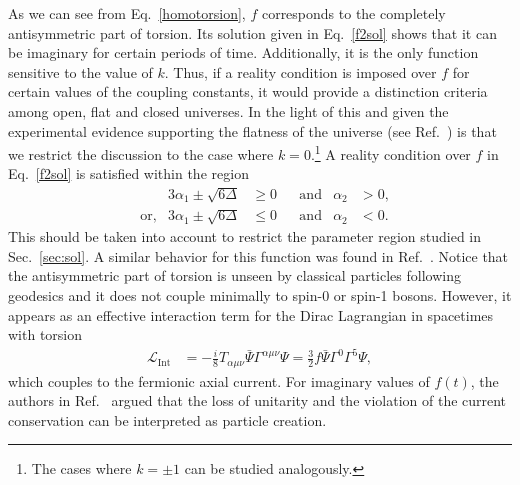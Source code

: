 \documentclass[aps,prd,12pt,superscriptaddress,showpacs,showkeys,longbibliography,reprint,nofootinbib]{revtex4-1}
\begin{document}



As we can see from Eq.~\eqref{homotorsion}, $f$ corresponds to the completely antisymmetric part of torsion. Its solution given in Eq.~\eqref{f2sol} shows that it can be imaginary for certain periods of time. Additionally, it is the only function sensitive to the value of $k$. Thus, if a reality condition is imposed over $f$ for certain values of the coupling constants, it would provide a distinction criteria among open, flat and closed universes. In the light of this and given the experimental evidence supporting the flatness of the universe (see Ref.~\cite{Spergel:2006hy}) is that we restrict the discussion to the case where $k=0$.\footnote{The cases where $k = \pm1$ can be studied analogously.} A reality condition over $f$ in Eq.~\eqref{f2sol} is satisfied within the region 
\begin{align*}
 & & 3\alpha_1 \pm \sqrt{6\Delta} &\geq 0 & &\mbox{and}& \alpha_2 &>0, \\
 & \mbox{or,} & 3\alpha_1 \pm \sqrt{6\Delta} &\leq 0 & &\mbox{and}& \alpha_2&<0.
\end{align*}
This should be taken into account to restrict the parameter region studied in Sec.~\ref{sec:sol}.  
A similar behavior for this function was found in Ref.~\cite{Toloza:2013wi}. Notice that the antisymmetric part of torsion is unseen by classical particles following geodesics and it does not couple minimally to spin-0 or spin-1 bosons. However, it appears as an effective interaction term for the Dirac Lagrangian in spacetimes with torsion~\cite{Hehl:1976kj}
\begin{align*}
  \mathcal{L}_{\text{Int}}&=-\frac{i}{8}T_{\alpha\mu\nu}\bar{\Psi}\Gamma^{\alpha\mu\nu}\Psi =\frac{3}{2}f\bar{\Psi}\Gamma^0\Gamma^5\Psi,
\end{align*}
which couples to the fermionic axial current. For imaginary values of $f(t)$, the authors in Ref.~\cite{Toloza:2013wi} argued that the loss of unitarity and the violation of the current conservation can be interpreted as particle creation. 
\end{document}

